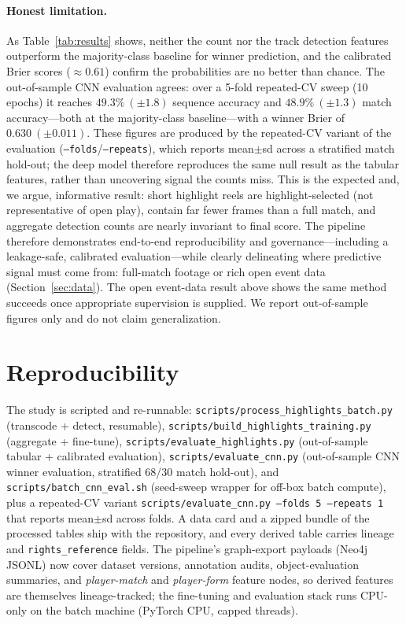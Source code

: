\documentclass[11pt]{article}
\begin{document}
\paragraph{Honest limitation.} As Table~\ref{tab:results} shows, neither the
count nor the track detection features outperform the majority-class baseline
for winner prediction, and the calibrated Brier scores ($\approx0.61$) confirm
the probabilities are no better than chance. The out-of-sample CNN evaluation
agrees: over a 5-fold repeated-CV sweep (10 epochs) it reaches
$49.3\%\ (\pm1.8)$ sequence accuracy and $48.9\%\ (\pm1.3)$ match accuracy---both
at the majority-class baseline---with a winner Brier of $0.630\ (\pm0.011)$. These
figures are produced by the repeated-CV variant of the evaluation
(\texttt{--folds}/\texttt{--repeats}), which reports mean$\pm$sd across a
stratified match hold-out; the deep model therefore reproduces the same null
result as the tabular features, rather than uncovering signal the counts miss. This is the
expected and, we argue,
informative result: short highlight reels are highlight-selected (not
representative of open play), contain far fewer frames than a full match, and
aggregate detection counts are nearly invariant to final score. The pipeline
therefore demonstrates end-to-end reproducibility and governance---including a
leakage-safe, calibrated evaluation---while clearly delineating where predictive
signal must come from: full-match footage or rich open event data
(Section~\ref{sec:data}). The open event-data result above shows the same method
succeeds once appropriate supervision is supplied. We report out-of-sample
figures only and do not claim generalization.

\section{Reproducibility}
The study is scripted and re-runnable: \texttt{scripts/process\_highlights\_batch.py}
(transcode + detect, resumable), \texttt{scripts/build\_highlights\_training.py}
(aggregate + fine-tune), \texttt{scripts/evaluate\_highlights.py} (out-of-sample
tabular + calibrated evaluation), \texttt{scripts/evaluate\_cnn.py}
(out-of-sample CNN winner evaluation, stratified 68/30 match hold-out), and
\texttt{scripts/batch\_cnn\_eval.sh} (seed-sweep wrapper for off-box batch
compute), plus a repeated-CV variant \texttt{scripts/evaluate\_cnn.py
--folds 5 --repeats 1} that reports mean$\pm$sd across folds. A data card and a
zipped bundle of the processed tables ship with the repository, and every
derived table carries lineage and \texttt{rights\_reference} fields. The
pipeline's graph-export payloads (Neo4j JSONL) now cover dataset versions,
annotation audits, object-evaluation summaries, and \emph{player-match} and
\emph{player-form} feature nodes, so derived features are themselves
lineage-tracked; the fine-tuning and evaluation stack runs CPU-only on the
batch machine (PyTorch CPU, capped threads).
\end{document}
